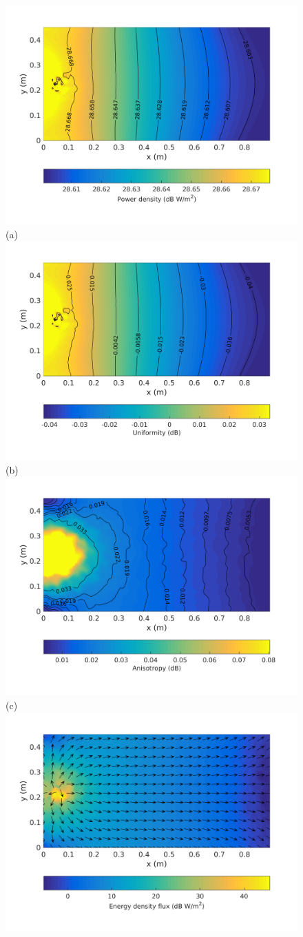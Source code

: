 \documentclass[a4paper]{article}
\numberwithin{equation}{section}
\begin{document}
\begin{figure}[hp]
\begin{center}
\includegraphics[trim={0 8mm 0 12mm},clip,width=0.52\linewidth]{figures/SDM_3D_SU_PowerDensityMap}\\
{\footnotesize (a)}\\
\vspace{2mm}
\includegraphics[trim={0 8mm 0 12mm},clip,width=0.52\linewidth]{figures/SDM_3D_SU_EnergyDensityUniformityMap}\\
{\footnotesize (b)}\\
\vspace{2mm}
\includegraphics[trim={0 8mm 0 12mm},clip,width=0.52\linewidth]{figures/SDM_3D_SU_EnergyDensityAnisotropyMap}\\
{\footnotesize (c)}\\
\vspace{2mm}
\includegraphics[trim={0 8mm 0 12mm},clip,width=0.52\linewidth]{figures/SDM_3D_SU_EnergyDensityFluxMap}\\

\end{center}
\end{figure}
\end{document}

